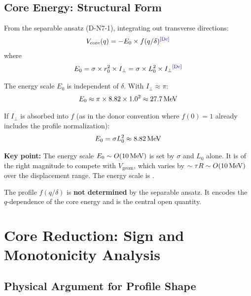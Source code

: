 \subsection{Core Energy: Structural Form}

From the separable ansatz (D-N7-1), integrating out transverse
directions:
\begin{equation}
    V_{\mathrm{core}}(q) = -E_0 \times f(q/\delta)
    \label{eq:N7_Vcore}
    \tagDc
\end{equation}
where
\begin{equation}
    E_0 = \sigma \times r_0^2 \times I_\perp
        = \sigma \times L_0^2 \times I_\perp
    \label{eq:N7_E0}
    \tagDc
\end{equation}

The energy scale $E_0$ is independent of $\delta$. With
$I_\perp \approx \pi$:
\begin{equation}
    E_0 \approx \pi \times 8.82 \times 1.0^2
        \approx 27.7\,\mathrm{MeV}
    \label{eq:N7_E0_value}
\end{equation}

If $I_\perp$ is absorbed into $f$ (as in the donor convention where
$f(0) = 1$ already includes the profile normalization):
\begin{equation}
    E_0 = \sigma L_0^2 \approx 8.82\,\mathrm{MeV}
    \label{eq:N7_E0_convention}
\end{equation}

\textbf{Key point:} The energy scale $E_0 \sim O(10\,\mathrm{MeV})$ is set by
$\sigma$ and $L_0$ alone. It is of the right magnitude to compete
with $V_{\mathrm{geom}}$, which varies by $\sim \tau R \sim O(10\,\mathrm{MeV})$
over the displacement range. The energy scale is \tagDc.

The profile $f(q/\delta)$ is \textbf{not determined} by the separable
ansatz. It encodes the $q$-dependence of the core energy and is the
central open quantity.

\section{Core Reduction: Sign and Monotonicity Analysis}
\label{sec:P2N7:reduction}

\subsection{Physical Argument for Profile Shape}

